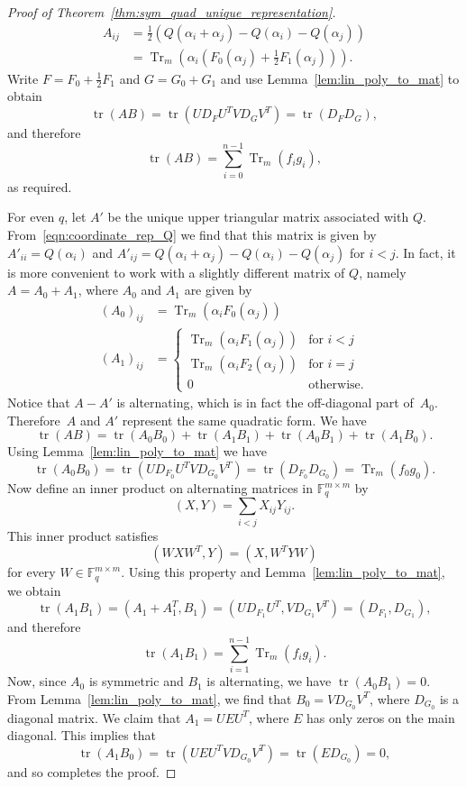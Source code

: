 \documentclass[10pt]{article}
\theoremstyle{definition}
\newcommand{\FF}{\mathbb{F}}
\DeclareMathOperator{\tr}{tr}
\DeclareMathOperator{\Tr}{Tr}
\begin{document}
\begin{proof}[Proof of Theorem~\ref{thm:sym_quad_unique_representation}]
\begin{align*}
A_{ij}&=\tfrac{1}{2}(Q(\alpha_i+\alpha_j)-Q(\alpha_i)-Q(\alpha_j))\\%
&=\Tr_m(\alpha_i(F_0(\alpha_j)+\tfrac{1}{2}F_1(\alpha_j))).
\end{align*}
Write $F=F_0+\tfrac{1}{2}F_1$ and $G=G_0+G_1$ and use Lemma~\ref{lem:lin_poly_to_mat} to obtain
\[
\tr(AB)=\tr(UD_FU^TVD_GV^T)=\tr(D_FD_G),
\]
and therefore
\[
\tr(AB)=\sum\limits_{i=0}^{n-1}\Tr_m(f_ig_i),
\]
as required.
\par
For even $q$, let $A'$ be the unique upper triangular matrix associated with $Q$. From~\eqref{eqn:coordinate_rep_Q} we find that this matrix is given by $A'_{ii}=Q(\alpha_i)$ and $A'_{ij}=Q(\alpha_i+\alpha_j)-Q(\alpha_i)-Q(\alpha_j)$ for $i<j$. In fact, it is more convenient to work with a slightly different matrix of $Q$, namely $A=A_0+A_1$, where $A_0$ and $A_1$ are given by 
\begin{align}
(A_0)_{ij}&=\Tr_m(\alpha_iF_0(\alpha_j))   \nonumber\\%
(A_1)_{ij}&=\begin{cases}
\Tr_m(\alpha_iF_1(\alpha_j)) & \text{for $i<j$}\\
\Tr_m(\alpha_iF_2(\alpha_j)) & \text{for $i=j$}\\
0                            & \text{otherwise}.
\end{cases}   \label{eqn:def_A1}
\end{align}
Notice that $A-A'$ is alternating, which is in fact the off-diagonal part of~$A_0$. Therefore~$A$ and $A'$ represent the same quadratic form. We have
\[
\tr(AB)=\tr(A_0B_0)+\tr(A_1B_1)+\tr(A_0B_1)+\tr(A_1B_0).
\]
Using Lemma~\ref{lem:lin_poly_to_mat} we have
\[
\tr(A_0B_0)=\tr(UD_{F_0}U^TVD_{G_0}V^T)=\tr(D_{F_0}D_{G_0})=\Tr_m(f_0g_0).
\]
Now define an inner product on alternating matrices in $\FF_q^{m\times m}$ by
\[
(X,Y)=\sum_{i<j}X_{ij}Y_{ij}.
\]
This inner product satisfies
\[
(WXW^T,Y)=(X,W^TYW)
\]
for every $W\in\FF_q^{m\times m}$. Using this property and Lemma~\ref{lem:lin_poly_to_mat}, we obtain
\[
\tr(A_1B_1)=(A_1+A_1^T,B_1)=(UD_{F_1}U^T,VD_{G_1}V^T)=(D_{F_1},D_{G_1}),
\]
and therefore
\[
\tr(A_1B_1)=\sum_{i=1}^{n-1}\Tr_m(f_ig_i).
\]
Now, since $A_0$ is symmetric and $B_1$ is alternating, we have $\tr(A_0B_1)=0$. From Lemma~\ref{lem:lin_poly_to_mat}, we find that $B_0=VD_{G_0}V^T$, where $D_{G_0}$ is a diagonal matrix. We claim that $A_1=UEU^T$, where $E$ has only zeros on the main diagonal. This implies that
\[
\tr(A_1B_0)=\tr(UEU^TVD_{G_0}V^T)=\tr(ED_{G_0})=0,
\]
and so completes the proof.
\par

\end{proof}
\end{document}

